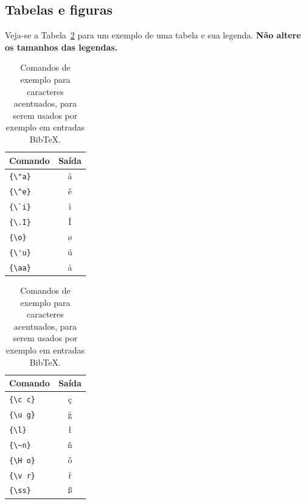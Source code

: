 \documentclass[11pt]{article}
\begin{document}
\subsection{Tabelas e figuras}

Veja-se a Tabela~\ref{tab:acentos} para um exemplo de uma tabela e sua legenda.
\textbf{Não altere os tamanhos das legendas.}
\begin{table}
  \centering
  \begin{tabular}{lc}
    \hline
    \textbf{Comando} & \textbf{Saída} \\
    \hline
    \verb|{\"a}|     & {\"a}           \\
    \verb|{\^e}|     & {\^e}           \\
    \verb|{\`i}|     & {\`i}           \\
    \verb|{\.I}|     & {\.I}           \\
    \verb|{\o}|      & {\o}            \\
    \verb|{\'u}|     & {\'u}           \\
    \verb|{\aa}|     & {\aa}           \\\hline
  \end{tabular}
  \begin{tabular}{lc}
    \hline
    \textbf{Comando} & \textbf{Saída} \\
    \hline
    \verb|{\c c}|    & {\c c}          \\
    \verb|{\u g}|    & {\u g}          \\
    \verb|{\l}|      & {\l}            \\
    \verb|{\~n}|     & {\~n}           \\
    \verb|{\H o}|    & {\H o}          \\
    \verb|{\v r}|    & {\v r}          \\
    \verb|{\ss}|     & {\ss}           \\
    \hline
  \end{tabular}
 \caption{Comandos de exemplo para caracteres acentuados, para serem usados por exemplo em entradas Bib\TeX{}.}
  \label{tab:acentos}
\end{table}
\end{document}
